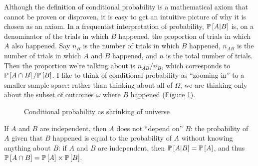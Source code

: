Although the definition of conditional probability is a mathematical axiom that
cannot be proven or disproven, it is easy to get an intuitive picture of why it
is chosen as an axiom. In a frequentist interpretation of probability, $\mathbb{P}\left[{A
| B}\right]$ is, on a denominator of the trials in which $B$ happened, the proportion
of trials in which $A$ also happened. Say $n_B$ is the number of trials in
which $B$ happened, $n_{AB}$ is the number of trials in which $A$ and $B$
happened, and $n$ is the total number of trials. Then the proportion we're
talking about is $n_{AB} / n_B$, which corresponds to $\mathbb{P}\left[{A \cap B}\right] /
\mathbb{P}\left[{B}\right]$. I like to think of conditional probability as ``zooming in'' to a
smaller sample space: rather than thinking about all of $\Omega$, we are
thinking only about the subset of outcomes $\omega$ where $B$ happened (Figure
\ref{fig:conditional-probability}).

\begin{figure}
\caption{Conditional probability as shrinking of universe}
\label{fig:conditional-probability}
\end{figure}

If $A$ and $B$ are independent, then $A$ does not ``depend on'' $B$: the
probability of $A$ given that $B$ happened is equal to the probability of $A$
without knowing anything about $B$: if $A$ and $B$ are independent, then
$\mathbb{P}\left[{A | B}\right] = \mathbb{P}\left[{A}\right]$, and thus $\mathbb{P}\left[{A \cap B}\right] = \mathbb{P}\left[{A}\right] \times
\mathbb{P}\left[{B}\right]$.

